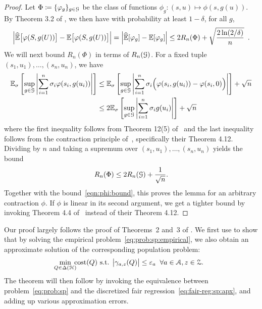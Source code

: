 \begin{proof}
Let $\Phi\coloneqq\{\varphi_g\}_{g\in\mathcal{G}}$ be the class of functions $\phi_g: (s,u)\mapsto \phi(s,g(u))$.
By Theorem 3.2 of \citet{BoucheronBoLu05}, we then
have with probability at least $1-\delta$, for all $g$,
%
\begin{equation}
\label{eqn:phi:bound}
  \Bigl\lvert
     \widehat{\mathbb{E}}\bigl[\varphi(S,g(U))\bigr]-\mathbb{E}\bigl[\varphi(S,g(U))\bigr]
  \Bigr\rvert
  =
  \Bigl\lvert\widehat{\mathbb{E}}[\varphi_g]-\mathbb{E}[\varphi_g]\Bigr\rvert
  \le
  2 R_n(\Phi)
  +
  \sqrt{\frac{2\ln(2/\delta)}{n}}
\enspace.
\end{equation}
%
We will next bound $R_n(\Phi)$ in terms of $R_n(\mathcal{G})$. For a fixed tuple $(s_1,u_1),\dotsc,(s_n,u_n)$, we have
%
\begin{align*}
 \mathbb{E}_\sigma\left[
     \sup_{g \in \mathcal{G}}  \left\lvert\sum_{i=1}^{n} \sigma_i \varphi(s_i,g(u_i)) \right\rvert
 \right]
&
\le
 \mathbb{E}_\sigma\left[
     \sup_{g \in \mathcal{G}}  \left\lvert\sum_{i=1}^{n} \sigma_i \Bigl(\varphi(s_i,g(u_i))-\varphi(s_i,0)\Bigr) \right\rvert
 \right]
 +
 \sqrt{n}
\\
&
\le
 2\mathbb{E}_\sigma\left[
     \sup_{g \in \mathcal{G}}  \left\lvert\sum_{i=1}^{n} \sigma_i g(u_i)\right\rvert
 \right]
 +
 \sqrt{n}
\end{align*}
%
where the first inequality follows from Theorem 12(5) of~\citet{BartlettMe02} and the last inequality follows from the contraction principle of~\citet{LedouxTa91}, specifically their Theorem 4.12.
Dividing by $n$ and taking a supremum over $(s_1,u_1),\dotsc,(s_n,u_n)$ yields the bound
\[
  R_n(\Phi)\le 2R_n(\mathcal{G})+\frac{1}{\sqrt{n}}.
\]
Together with the bound~\eqref{eqn:phi:bound}, this proves the lemma for an arbitrary contraction $\phi$. If $\phi$ is linear in its second argument, we get a tighter bound by invoking Theorem 4.4 of~\citet{LedouxTa91} instead of their Theorem 4.12.
\end{proof}

Our proof largely follows the proof of Theorems~2 and~3 of \citet{agarwal2018reductions}. We first use  to show that by solving the empirical problem~\eqref{eq:prob:sp:empirical}, we also obtain an approximate solution of the corresponding population problem:
%
\begin{align}
\label{eq:prob:sp}
  \min_{\mathclap{Q\in\Delta(\calH)}}\;\cost(Q)
\text{ s.t. }
  \bigAbs{\gamma_{a,z}(Q)}\le\eps_a
\;\;
  \text{$\forall a\in\calA, z\in\calZ$.}
%
\end{align}
%
The theorem will then follow by invoking the equivalence between problem~\eqref{eq:prob:sp} and the discretized
fair regression~\eqref{eq:fair-reg:sp:apx}, and adding up various approximation errors.

